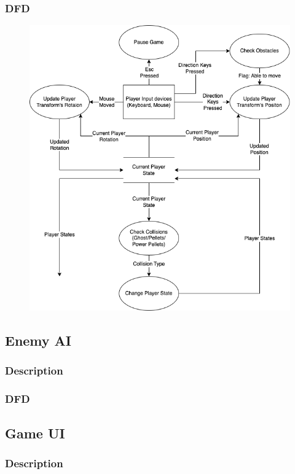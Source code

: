 \documentclass{article}
\begin{document}
\subsubsection{DFD}
\begin{figure}[H]
    \centering
    \includegraphics*[scale=0.4]{PlayerControl_DFD.png}
\end{figure}

\subsection{Enemy AI}
\subsubsection{Description}

\subsubsection{DFD}

\subsection{Game UI}
\subsubsection{Description}
\end{document}
